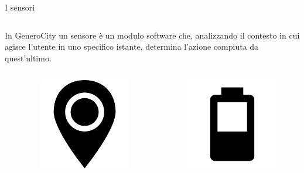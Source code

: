 \documentclass{beamer}
\begin{document}
\begin{frame}{I sensori}
\vspace{0.5cm}
\begin{columns}
    \begin{column}{0.95\textwidth}
        In GeneroCity un sensore è un modulo software che, analizzando il contesto in cui agisce l’utente in uno specifico istante, determina l’azione compiuta da quest’ultimo.
    \end{column}
\end{columns}
\vspace{0.5cm}

\begin{columns}
    \begin{column}{0.15\linewidth}
    \end{column}
    \begin{column}{0.15\linewidth}
        \begin{figure}
            \centering
            \includegraphics[width=0.7\linewidth]{assets/ic_gps.png}
        \end{figure}
    \end{column}
    \begin{column}{0.15\linewidth}
        \begin{figure}
            \centering
            \includegraphics[width=0.8\linewidth]{assets/ic_battery.png}

\end{figure}
\end{column}
\end{columns}
\end{frame}
\end{document}
